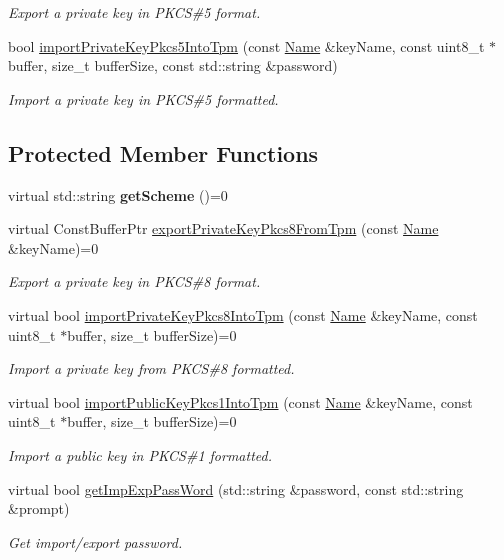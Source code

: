 \begin{DoxyCompactItemize}
\begin{DoxyCompactList}\small\item\em Export a private key in P\+K\+CS\#5 format. \end{DoxyCompactList}\item 
bool \hyperlink{classndn_1_1SecTpm_a22bef069d27b9e03959f439ab6902d32}{import\+Private\+Key\+Pkcs5\+Into\+Tpm} (const \hyperlink{classndn_1_1Name}{Name} \&key\+Name, const uint8\+\_\+t $\ast$buffer, size\+\_\+t buffer\+Size, const std\+::string \&password)
\begin{DoxyCompactList}\small\item\em Import a private key in P\+K\+CS\#5 formatted. \end{DoxyCompactList}\end{DoxyCompactItemize}
\subsection*{Protected Member Functions}
\begin{DoxyCompactItemize}
\item 
virtual std\+::string {\bfseries get\+Scheme} ()=0\hypertarget{classndn_1_1SecTpm_a49d419e0e632ddbd696aa7018b00d0c2}{}\label{classndn_1_1SecTpm_a49d419e0e632ddbd696aa7018b00d0c2}

\item 
virtual Const\+Buffer\+Ptr \hyperlink{classndn_1_1SecTpm_af4eb2f9e9a58751bba27b755e75ca370}{export\+Private\+Key\+Pkcs8\+From\+Tpm} (const \hyperlink{classndn_1_1Name}{Name} \&key\+Name)=0
\begin{DoxyCompactList}\small\item\em Export a private key in P\+K\+CS\#8 format. \end{DoxyCompactList}\item 
virtual bool \hyperlink{classndn_1_1SecTpm_a38cde662778a2a4cdd2911d7c8931d0e}{import\+Private\+Key\+Pkcs8\+Into\+Tpm} (const \hyperlink{classndn_1_1Name}{Name} \&key\+Name, const uint8\+\_\+t $\ast$buffer, size\+\_\+t buffer\+Size)=0
\begin{DoxyCompactList}\small\item\em Import a private key from P\+K\+CS\#8 formatted. \end{DoxyCompactList}\item 
virtual bool \hyperlink{classndn_1_1SecTpm_a66d99ac62036d7ac9369e6a1d6c6e2c7}{import\+Public\+Key\+Pkcs1\+Into\+Tpm} (const \hyperlink{classndn_1_1Name}{Name} \&key\+Name, const uint8\+\_\+t $\ast$buffer, size\+\_\+t buffer\+Size)=0
\begin{DoxyCompactList}\small\item\em Import a public key in P\+K\+CS\#1 formatted. \end{DoxyCompactList}\item 
virtual bool \hyperlink{classndn_1_1SecTpm_a1402149f80fcf1247f7e74189a497c4d}{get\+Imp\+Exp\+Pass\+Word} (std\+::string \&password, const std\+::string \&prompt)
\begin{DoxyCompactList}\small\item\em Get import/export password. \end{DoxyCompactList}\end{DoxyCompactItemize}
